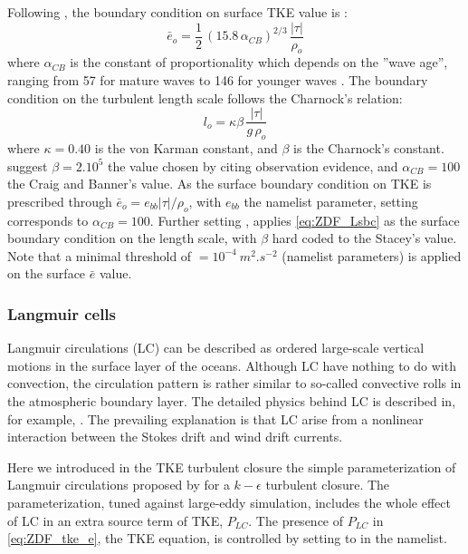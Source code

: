 \documentclass[../main/NEMO_manual]{subfiles}
\begin{document}
Following \citet{craig.banner_JPO94}, the boundary condition on surface TKE value is :
\begin{equation}
  \label{eq:ZDF_Esbc}
  \bar{e}_o = \frac{1}{2}\,\left(  15.8\,\alpha_{CB} \right)^{2/3} \,\frac{|\tau|}{\rho_o}
\end{equation}
where $\alpha_{CB}$ is the \citet{craig.banner_JPO94} constant of proportionality which depends on the ''wave age'',
ranging from 57 for mature waves to 146 for younger waves \citep{mellor.blumberg_JPO04}.
The boundary condition on the turbulent length scale follows the Charnock's relation:
\begin{equation}
  \label{eq:ZDF_Lsbc}
  l_o = \kappa \beta \,\frac{|\tau|}{g\,\rho_o}
\end{equation}
where $\kappa=0.40$ is the von Karman constant, and $\beta$ is the Charnock's constant.
\citet{mellor.blumberg_JPO04} suggest $\beta = 2.10^{5}$ the value chosen by
\citet{stacey_JPO99} citing observation evidence, and
$\alpha_{CB} = 100$ the Craig and Banner's value.
As the surface boundary condition on TKE is prescribed through $\bar{e}_o = e_{bb} |\tau| / \rho_o$,
with $e_{bb}$ the  namelist parameter, setting  corresponds
to $\alpha_{CB} = 100$.
Further setting  ,  applies \autoref{eq:ZDF_Lsbc} as the surface boundary condition on the length scale,
with $\beta$ hard coded to the Stacey's value.
Note that a minimal threshold of $=10^{-4}~m^2.s^{-2}$ (namelist parameters) is applied on the
surface $\bar{e}$ value.

\subsubsection{Langmuir cells}

Langmuir circulations (LC) can be described as ordered large-scale vertical motions in
the surface layer of the oceans.
Although LC have nothing to do with convection, the circulation pattern is rather similar to
so-called convective rolls in the atmospheric boundary layer.
The detailed physics behind LC is described in, for example, \citet{craik.leibovich_JFM76}.
The prevailing explanation is that LC arise from a nonlinear interaction between the Stokes drift and
wind drift currents.

Here we introduced in the TKE turbulent closure the simple parameterization of Langmuir circulations proposed by
\citep{axell_JGR02} for a $k-\epsilon$ turbulent closure.
The parameterization, tuned against large-eddy simulation, includes the whole effect of LC in
an extra source term of TKE, $P_{LC}$.
The presence of $P_{LC}$ in \autoref{eq:ZDF_tke_e}, the TKE equation, is controlled by setting  to
 in the  namelist.
\end{document}
